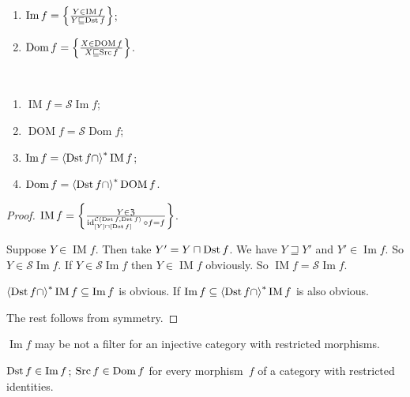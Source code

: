 \begin{defn}
~
\begin{enumerate}
\item $\operatorname{Im} f = \left\{ \frac{Y\in\operatorname{IM} f}{Y\sqsubseteq\operatorname{Dst} f}\right\}$;
\item $\operatorname{Dom} f = \left\{ \frac{X\in\operatorname{DOM} f}{X\sqsubseteq\operatorname{Src} f}\right\}$.
\end{enumerate}
\end{defn}

\begin{prop}
~
\begin{enumerate}
\item $\operatorname{IM} f = \mathscr{S}\operatorname{Im} f$;
\item $\operatorname{DOM} f = \mathscr{S}\operatorname{Dom} f$;
\item $\operatorname{Im} f = \left\langle \operatorname{Dst} f\cap\right\rangle ^{\ast}\operatorname{IM} f$;
\item $\operatorname{Dom} f = \left\langle \operatorname{Dst} f\cap\right\rangle ^{\ast}\operatorname{DOM} f$.
\end{enumerate}
\end{prop}

\begin{proof}
$\operatorname{IM} f =
\left\{ \frac{Y \in \mathfrak{Z}}{\operatorname{id}^{\mathcal{C}(\operatorname{Dst} f,\operatorname{Dst} f)}_{[Y]\sqcap[\operatorname{Dst} f]} \circ f = f}\right\}$.

Suppose $Y\in\operatorname{IM}f$. Then take $Y'=Y\sqcap\operatorname{Dst} f$. We have $Y\sqsupseteq Y'$ and $Y'\in\operatorname{Im}f$. So $Y\in\mathscr{S}\operatorname{Im}f$. If $Y\in\mathscr{S}\operatorname{Im}f$ then $Y\in\operatorname{IM}f$ obviously.
So $\operatorname{IM} f = \mathscr{S}\operatorname{Im} f$.

$\left\langle \operatorname{Dst} f\cap\right\rangle ^{\ast}\operatorname{IM}f\subseteq
\operatorname{Im}f$ is obvious. If
$\operatorname{Im}f\subseteq\left\langle \operatorname{Dst} f\cap\right\rangle ^{\ast}\operatorname{IM}f$ is also obvious.

The rest follows from symmetry.
\end{proof}

\begin{conjecture}
$\operatorname{Im} f$ may be not a filter for an injective
category with restricted morphisms.
\end{conjecture}

\begin{prop}\label{dst-in-im}
$\operatorname{Dst} f\in\operatorname{Im} f$; $\operatorname{Src} f\in\operatorname{Dom} f$ for every morphism~$f$ of a category with restricted
identities.
\end{prop}

